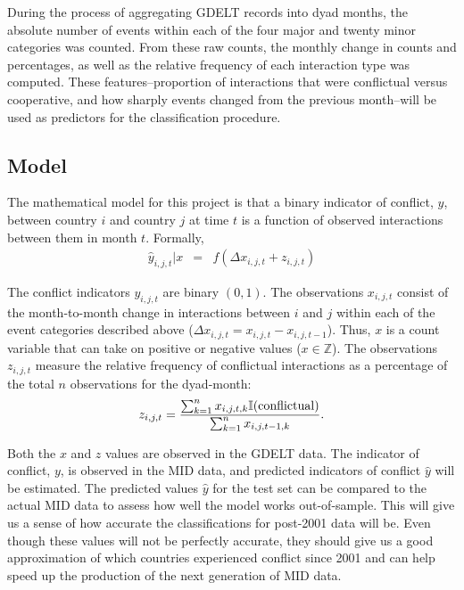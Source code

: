 \documentclass[12pt,letterpaper]{article} %
\begin{document}
During the process of aggregating GDELT records into dyad months, the absolute number of events within each of the four major and twenty minor categories was counted. From these raw counts, the monthly change in counts and percentages, as well as the relative frequency of each interaction type was computed. These features--proportion of interactions that were conflictual versus cooperative, and how sharply events changed from the previous month--will be used as predictors for the classification procedure. 

\subsection{Model}




The mathematical model for this project is that a binary indicator of conflict, $y$, between country $i$ and country $j$ at time $t$ is a function of observed interactions between them in month $t$. Formally, 
\begin{eqnarray*}
\hat{y}_{i,j,t}|x &=& f(\Delta x_{i,j,t} + z_{i,j,t})
\end{eqnarray*}

The conflict indicators $y_{i,j,t}$ are binary $(0,1)$. The observations $x_{i,j,t}$ consist of the month-to-month change in interactions between $i$ and $j$ within each of the event categories described above ($\Delta x_{i,j,t} = x_{i,j,t} - x_{i,j,t-1}$). Thus, $x$ is a count variable that can take on positive or negative values ($x \in \mathbb{Z}$). The observations $z_{i,j,t}$ measure the relative frequency of conflictual interactions as a percentage of the total $n$ observations for the dyad-month: 
\begin{eqnarray*}
z_{i,j,t} = {\sum_{k=1}^n x_{i,j,t,k} \mathbb{I}(\text{conflictual})  \over \sum_{k=1}^n x_{i,j,t-1,k} }.
\end{eqnarray*}


Both the $x$ and $z$ values are observed in the GDELT data. The indicator of conflict, $y$, is observed in the MID data, and predicted indicators of conflict $\hat{y}$ will be estimated. The predicted values $\hat{y}$ for the test set can be compared to the actual MID data to assess how well the model works out-of-sample. This will give us a sense of how accurate the classifications for post-2001 data will be. Even though these values will not be perfectly accurate, they should give us a good approximation of which countries experienced conflict since 2001 and can help speed up the production of the next generation of MID data. 
\end{document}
